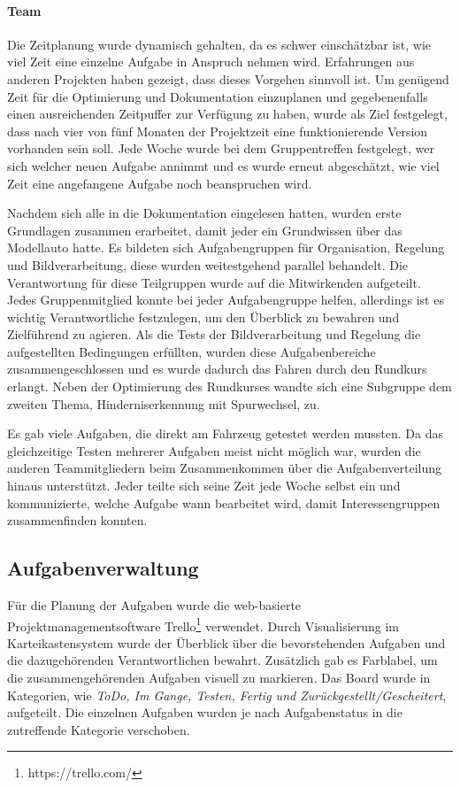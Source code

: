 \paragraph{Team}

Die Zeitplanung wurde dynamisch gehalten, da es schwer einschätzbar ist, wie viel Zeit eine einzelne Aufgabe in Anspruch nehmen wird. Erfahrungen aus anderen Projekten haben gezeigt, dass dieses Vorgehen sinnvoll ist. Um genügend Zeit für die Optimierung und Dokumentation einzuplanen und gegebenenfalls einen ausreichenden Zeitpuffer zur Verfügung zu haben, wurde als Ziel festgelegt, dass nach vier von fünf Monaten der Projektzeit eine funktionierende Version vorhanden sein soll. Jede Woche wurde bei dem Gruppentreffen festgelegt, wer sich welcher neuen Aufgabe annimmt und es wurde erneut abgeschätzt, wie viel Zeit eine angefangene Aufgabe noch beanspruchen wird.


Nachdem sich alle in die Dokumentation eingelesen hatten, wurden erste Grundlagen zusammen erarbeitet, damit jeder ein Grundwissen über das Modellauto hatte. Es bildeten sich Aufgabengruppen für Organisation, Regelung und Bildverarbeitung, diese wurden weitestgehend parallel behandelt. Die Verantwortung für diese Teilgruppen wurde auf die Mitwirkenden aufgeteilt. Jedes Gruppenmitglied konnte bei jeder Aufgabengruppe helfen, allerdings ist es wichtig Verantwortliche festzulegen, um den Überblick zu bewahren und Zielführend zu agieren. Als die Tests der Bildverarbeitung und Regelung die aufgestellten Bedingungen erfüllten, wurden diese Aufgabenbereiche zusammengeschlossen und es wurde dadurch das Fahren durch den Rundkurs erlangt. Neben der Optimierung des Rundkurses wandte sich eine Subgruppe dem zweiten Thema, Hinderniserkennung mit Spurwechsel, zu.

Es gab viele Aufgaben, die direkt am Fahrzeug getestet werden mussten. Da das gleichzeitige Testen mehrerer Aufgaben meist nicht möglich war, wurden die anderen Teammitgliedern beim Zusammenkommen über die Aufgabenverteilung hinaus unterstützt. Jeder teilte sich seine Zeit jede Woche selbst ein und kommunizierte, welche Aufgabe wann bearbeitet wird, damit Interessengruppen zusammenfinden konnten. 

\subsection{Aufgabenverwaltung}
\label{sec:aufgabenverwaltung}
Für die Planung der Aufgaben wurde die web-basierte Projektmanagementsoftware Trello\footnote{https://trello.com/} verwendet. Durch Visualisierung im Karteikastensystem wurde der Überblick über die bevorstehenden Aufgaben und die dazugehörenden Verantwortlichen bewahrt. Zusätzlich gab es Farblabel, um die zusammengehörenden Aufgaben visuell zu markieren. Das Board wurde in Kategorien, wie \textit{ToDo, Im Gange, Testen, Fertig und Zurückgestellt/Gescheitert}, aufgeteilt. Die einzelnen Aufgaben wurden je nach Aufgabenstatus in die zutreffende Kategorie verschoben. 

